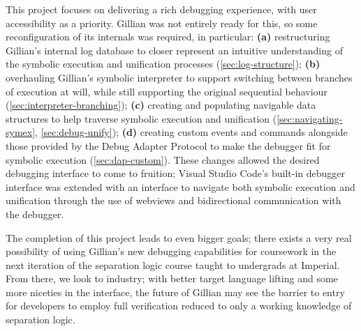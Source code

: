 This project focuses on delivering a rich debugging experience, with user
accessibility as a priority. Gillian was not entirely ready for this, so some
reconfiguration of its internals was required, in particular: {\bf (a)}
restructuring Gillian's internal log database to closer represent an intuitive
understanding of the symbolic execution and unification processes
(\autoref{sec:log-structure}); {\bf (b)} overhauling Gillian's symbolic
interpreter to support switching between branches of execution at will, while
still supporting the original sequential behaviour
(\autoref{sec:interpreter-branching}); {\bf (c)} creating and populating
navigable data structures to help traverse symbolic execution and unification
(\autoref{sec:navigating-symex}, \autoref{sec:debug-unify}); {\bf (d)} creating
custom events and commands alongside those provided by the Debug Adapter
Protocol to make the debugger fit for symbolic execution
(\autoref{sec:dap-custom}). These changes allowed the desired debugging
interface to come to fruition; Visual Studio Code's built-in debugger interface
was extended with an interface to navigate both symbolic execution and
unification through the use of webviews and bidirectional communication with
the debugger.

The completion of this project leads to even bigger goals; there exists a very
real possibility of using Gillian's new debugging capabilities for coursework in
the next iteration of the separation logic course taught to undergrads at
Imperial. From there, we look to industry; with better target language lifting
and some more niceties in the interface, the future of Gillian may see the
barrier to entry for developers to employ full verification reduced to only a
working knowledge of separation logic.
